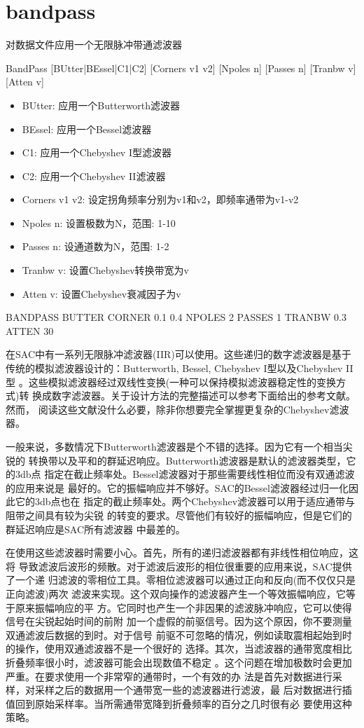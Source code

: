 \section{bandpass}
\label{cmd:bandpass}

对数据文件应用一个无限脉冲带通滤波器

BandPass [BUtter|BEssel|C1|C2] [Corners v1 v2] [Npoles n] [Passes n] [Tranbw v] [Atten v]

\begin{itemize}
\item BUtter: 应用一个Butterworth滤波器
\item BEssel: 应用一个Bessel滤波器
\item C1: 应用一个Chebyshev I型滤波器
\item C2: 应用一个Chebyshev II滤波器
\item Corners v1 v2: 设定拐角频率分别为v1和v2，即频率通带为v1-v2
\item Npoles n: 设置极数为N，范围: 1-10
\item Passes n: 设通道数为N，范围: 1-2
\item Tranbw v: 设置Chebyshev转换带宽为v
\item Atten v: 设置Chebyshev衰减因子为v
\end{itemize}

BANDPASS BUTTER CORNER 0.1 0.4 NPOLES 2 PASSES 1 TRANBW 0.3 ATTEN 30

在SAC中有一系列无限脉冲滤波器(IIR)可以使用。这些递归的数字滤波器是基于
传统的模拟滤波器设计的：Butterworth, Bessel, Chebyshev I型以及Chebyshev II型
。这些模拟滤波器经过双线性变换(一种可以保持模拟滤波器稳定性的变换方式)转
换成数字滤波器。关于设计方法的完整描述可以参考下面给出的参考文献。然而，
阅读这些文献没什么必要，除非你想要完全掌握更复杂的Chebyshev滤波器。

一般来说，多数情况下Butterworth滤波器是个不错的选择。因为它有一个相当尖锐的
转换带以及平和的群延迟响应。Butterworth滤波器是默认的滤波器类型，它的3db点
指定在截止频率处。Bessel滤波器对于那些需要线性相位而没有双通滤波的应用来说是
最好的。它的振幅响应并不够好。SAC的Bessel滤波器经过归一化因此它的3db点也在
指定的截止频率处。两个Chebyshev滤波器可以用于适应通带与阻带之间具有较为尖锐
的转变的要求。尽管他们有较好的振幅响应，但是它们的群延迟响应是SAC所有滤波器
中最差的。

在使用这些滤波器时需要小心。首先，所有的递归滤波器都有非线性相位响应，这将
导致滤波后波形的频散。对于滤波后波形的相位很重要的应用来说，SAC提供了一个递
归滤波的零相位工具。零相位滤波器可以通过正向和反向(而不仅仅只是正向滤波)两次
滤波来实现。这个双向操作的滤波器产生一个等效振幅响应，它等于原来振幅响应的平
方。它同时也产生一个非因果的滤波脉冲响应，它可以使得信号在尖锐起始时间的前附
加一个虚假的前驱信号。因为这个原因，你不要测量双通滤波后数据的到时。对于信号
前驱不可忽略的情况，例如读取震相起始到时的操作，使用双通滤波器不是一个很好的
选择。其次，当滤波器的通带宽度相比折叠频率很小时，滤波器可能会出现数值不稳定
。这个问题在增加极数时会更加严重。在要求使用一个非常窄的通带时，一个有效的办
法是首先对数据进行采样，对采样之后的数据用一个通带宽一些的滤波器进行滤波，最
后对数据进行插值回到原始采样率。当所需通带宽降到折叠频率的百分之几时很有必	
要使用这种策略。

